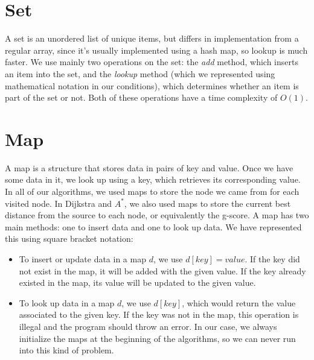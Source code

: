 \documentclass[12pt]{report}
\begin{document}
\begin{appendices}
\section{Set}
A set is an unordered list of unique items, but differs in implementation from a regular array, since it's usually implemented using a hash map, so lookup is much faster. We use mainly two operations on the set: the \emph{add} method, which inserts an item into the set, and the \emph{lookup} method (which we represented using mathematical notation in our conditions), which determines whether an item is part of the set or not. Both of these operations have a time complexity of $O(1)$.

\section{Map}
A map is a structure that stores data in pairs of key and value. Once we have some data in it, we look up using a key, which retrieves its corresponding value. In all of our algorithms, we used maps to store the node we came from for each visited node. In Dijkstra and $A^*$, we also used maps to store the current best distance from the source to each node, or equivalently the g-score. A map has two main methods: one to insert data and one to look up data. We have represented this using square bracket notation:
\begin{itemize}
\item To insert or update data in a map $d$, we use $d[key] = value$. If the key did not exist in the map, it will be added with the given value. If the key already existed in the map, its value will be updated to the given value.
\item To look up data in a map $d$, we use $d[key]$, which would return the value associated to the given key. If the key was not in the map, this operation is illegal and the program should throw an error. In our case, we always initialize the maps at the beginning of the algorithms, so we can never run into this kind of problem.
\end{itemize}

\end{appendices}
\end{document}
